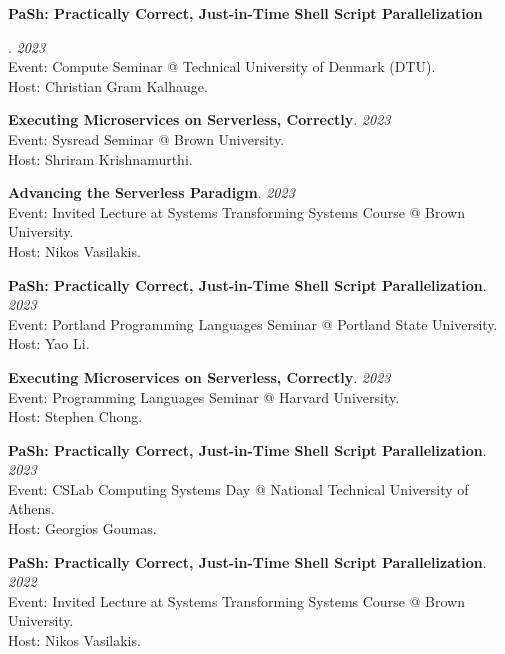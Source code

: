 \begin{minipage}{\textwidth}
\hypertarget{sec:talks}{\textbf{PaSh: Practically Correct, Just-in-Time Shell Script Parallelization}}. \hfill {\em 2023}\\
Event: Compute Seminar @ Technical University of Denmark (DTU).\\
 Host: Christian Gram Kalhauge.
\end{minipage}

\begin{minipage}{\textwidth}
\textbf{Executing Microservices on Serverless, Correctly}. \hfill {\em 2023}\\
Event: Sysread Seminar @ Brown University.\\
 Host: Shriram Krishnamurthi.
\end{minipage}

\begin{minipage}{\textwidth}
\textbf{Advancing the Serverless Paradigm}. \hfill {\em 2023}\\
Event: Invited Lecture at Systems Transforming Systems Course @ Brown University.\\
 Host: Nikos Vasilakis.
\end{minipage}

\begin{minipage}{\textwidth}
\textbf{PaSh: Practically Correct, Just-in-Time Shell Script Parallelization}. \hfill {\em 2023}\\
Event: Portland Programming Languages Seminar @ Portland State University.\\
 Host: Yao Li.
\end{minipage}

\begin{minipage}{\textwidth}
\textbf{Executing Microservices on Serverless, Correctly}. \hfill {\em 2023}\\
Event: Programming Languages Seminar @ Harvard University.\\
 Host: Stephen Chong.
\end{minipage}

\begin{minipage}{\textwidth}
\textbf{PaSh: Practically Correct, Just-in-Time Shell Script Parallelization}. \hfill {\em 2023}\\
Event: CSLab Computing Systems Day @ National Technical University of Athens.\\
 Host: Georgios Goumas.
\end{minipage}

\begin{minipage}{\textwidth}
\textbf{PaSh: Practically Correct, Just-in-Time Shell Script Parallelization}. \hfill {\em 2022}\\
Event: Invited Lecture at Systems Transforming Systems Course @ Brown University.\\
 Host: Nikos Vasilakis.
\end{minipage}

